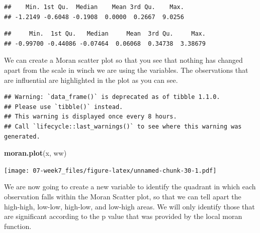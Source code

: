 \documentclass[]{book}
\newenvironment{Shaded}{\begin{snugshade}}{\end{snugshade}}
\newcommand{\KeywordTok}[1]{\textcolor[rgb]{0.13,0.29,0.53}{\textbf{#1}}}
\newcommand{\NormalTok}[1]{#1}
\newcommand{\OperatorTok}[1]{\textcolor[rgb]{0.81,0.36,0.00}{\textbf{#1}}}
\newcommand{\StringTok}[1]{\textcolor[rgb]{0.31,0.60,0.02}{#1}}
\begin{document}
\begin{verbatim}
##    Min. 1st Qu.  Median    Mean 3rd Qu.    Max. 
## -1.2149 -0.6048 -0.1908  0.0000  0.2667  9.0256
\end{verbatim}

\begin{Shaded}
\end{Shaded}

\begin{verbatim}
##     Min.  1st Qu.   Median     Mean  3rd Qu.     Max. 
## -0.99700 -0.44086 -0.07464  0.06068  0.34738  3.38679
\end{verbatim}

We can create a Moran scatter plot so that you see that nothing has changed apart from the scale in winch we are using the variables. The observations that are influential are highlighted in the plot as you can see.

\begin{Shaded}
\end{Shaded}

\begin{verbatim}
## Warning: `data_frame()` is deprecated as of tibble 1.1.0.
## Please use `tibble()` instead.
## This warning is displayed once every 8 hours.
## Call `lifecycle::last_warnings()` to see where this warning was generated.
\end{verbatim}

\begin{Shaded}
\begin{Highlighting}[]
\KeywordTok{moran.plot}\NormalTok{(x, ww)}
\end{Highlighting}
\end{Shaded}

\texttt{[image: 07-week7\_files/figure-latex/unnamed-chunk-30-1.pdf]}

We are now going to create a new variable to identify the quadrant in which each observation falls within the Moran Scatter plot, so that we can tell apart the high-high, low-low, high-low, and low-high areas. We will only identify those that are significant according to the p value that was provided by the local moran function.
\end{document}
